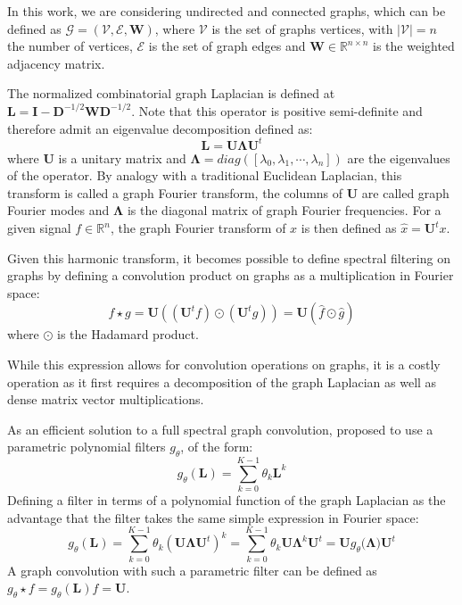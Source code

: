 \documentclass[a4paper,fleqn,usenatbib]{mnras}
\begin{document}
In this work, we are considering undirected and connected graphs, which can be defined as  $\mathcal{G} = (\mathcal{V} , \mathcal{E}, \mathbf{W})$, where $\mathcal{V}$ is the set of graphs vertices, with $\left\vert \mathcal{V} \right\vert = n$ the number of vertices,  $\mathcal{E}$ is the set of graph edges and $\mathbf{W} \in \mathbb{R}^{n \times  n}$ is the weighted adjacency matrix.

The normalized combinatorial graph  Laplacian is defined at $\mathbf{L} = \mathbf{I} - \mathbf{D}^{-1/2} \mathbf{W} \mathbf{D}^{-1/2}$. Note that this operator is positive semi-definite and therefore  admit an eigenvalue decomposition defined as:
\begin{equation}
	\mathbf{L} = \mathbf{U} \mathbf{\Lambda} \mathbf{U}^t
\end{equation}
where $\mathbf{U}$ is a unitary matrix and $\mathbf{\Lambda} = diag([\lambda_0, \lambda_1, \cdots, \lambda_n])$ are the eigenvalues  of the operator. By analogy with a traditional Euclidean Laplacian, this transform is called a graph Fourier transform, the columns of $\mathbf{U}$ are called graph Fourier modes  and $\mathbf{\Lambda}$ is the diagonal matrix of graph Fourier frequencies. For a given signal $f \in \mathbb{R}^n$, the graph Fourier transform of $x$ is then defined as $\hat{x} = \mathbf{U}^t x$. 

Given this  harmonic transform, it becomes possible to define spectral filtering on graphs by defining a convolution product on graphs as a multiplication in Fourier space:
\begin{equation}
	f  \star g = \mathbf{U} \left( ( \mathbf{U}^t f) \odot  ( \mathbf{U}^t g ) \right) = \mathbf{U} \left(  \hat{f} \odot \hat{g} \right)
\end{equation}
where $\odot$ is the Hadamard product.

While this expression allows for convolution operations  on graphs, it is a costly operation as it first requires a decomposition of the  graph Laplacian as well as dense matrix vector multiplications. 

As an efficient solution to a  full spectral graph  convolution, \cite{Defferrard2016} proposed to use a parametric polynomial filters $g_\theta$, of the form:
\begin{equation}
	g_\theta(\mathbf{L}) = \sum_{k=0}^{K-1} \theta_k \mathbf{L}^k
\end{equation}
Defining a filter in  terms of a polynomial function of the graph Laplacian as the advantage that the filter takes the same simple expression in Fourier space: 
\begin{equation}
	g_\theta(\mathbf{L}) =  \sum_{k=0}^{K-1} \theta_k (\mathbf{U} \mathbf{\Lambda}  \mathbf{U}^t)^k  = \sum_{k=0}^{K-1} \theta_k \mathbf{U} \mathbf{\Lambda}^k \mathbf{U}^t =  \mathbf{U}  g_\theta(\mathbf{\Lambda)} \mathbf{U}^t 
\end{equation}
A graph convolution with such a parametric filter can be defined as $g_\theta \star f = g_\theta(\mathbf{L}) f = \mathbf{U} $.
\end{document}

